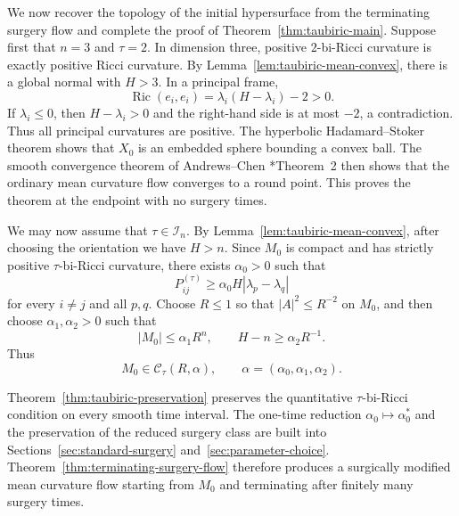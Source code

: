 \documentclass[11pt,reqno]{amsart}
\theoremstyle{definition}
\theoremstyle{remark}
\numberwithin{equation}{section}
\newcommand{\Ric}{\operatorname{Ric}}
\newcommand{\CC}{\mathcal C}
\begin{document}
We now recover the topology of the initial hypersurface from the terminating
surgery flow and complete the proof of Theorem~\ref{thm:taubiric-main}.   Suppose first that $n=3$ and $\tau=2$.  In dimension three, positive
  $2$-bi-Ricci curvature is exactly positive Ricci curvature.  By
  Lemma~\ref{lem:taubiric-mean-convex}, there is a global normal with $H>3$.
  In a principal frame,
  \begin{equation*}
  \Ric(e_i,e_i)=\lambda_i(H-\lambda_i)-2>0.
  \end{equation*}
  If $\lambda_i\leq0$, then $H-\lambda_i>0$ and the right-hand side is at most
  $-2$, a contradiction.  Thus all principal curvatures are positive.  The
  hyperbolic Hadamard--Stoker theorem \cite{Alexander77} shows that $X_0$ is an
  embedded sphere bounding a convex ball.  The smooth convergence theorem of
  Andrews--Chen \cite{AC17}*{Theorem~2} then shows that the ordinary mean
  curvature flow converges to a round point.  This proves the theorem at the
  endpoint with no surgery times.

  We may now assume that $\tau\in\mathcal I_n$.  By
  Lemma~\ref{lem:taubiric-mean-convex}, after choosing the orientation we have
  $H>n$.  Since $M_0$ is compact and has strictly positive $\tau$-bi-Ricci
  curvature, there exists $\alpha_0>0$ such that
  \begin{equation*}
  P_{ij}^{(\tau)}
  \geq
  \alpha_0H|\lambda_p-\lambda_q|
  \end{equation*}
  for every $i\ne j$ and all $p,q$.  Choose $R\leq 1$ so that $ |A|^2\leq R^{-2}$  
  on $M_0$, and then choose $\alpha_1,\alpha_2>0$ such that
  \begin{equation*}
  |M_0|\leq\alpha_1R^n,
  \qquad
  H-n\geq\alpha_2R^{-1}.
  \end{equation*}
  Thus
  \begin{equation*}
  M_0\in\CC_\tau(R,\alpha),
  \qquad
  \alpha=(\alpha_0,\alpha_1,\alpha_2).
  \end{equation*}

  Theorem~\ref{thm:taubiric-preservation} preserves the quantitative
  $\tau$-bi-Ricci condition on every smooth time interval.  The one-time
  reduction $\alpha_0\mapsto\alpha_0^*$ and the preservation of the reduced
  surgery class are built into Sections~\ref{sec:standard-surgery}
  and~\ref{sec:parameter-choice}.
  Theorem~\ref{thm:terminating-surgery-flow}
  therefore produces a surgically modified mean curvature flow starting from
  $M_0$ and terminating after finitely many surgery times.
\end{document}
